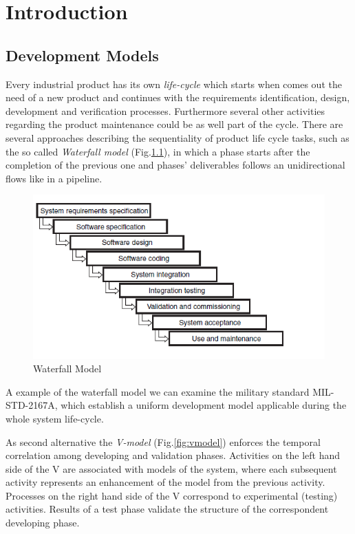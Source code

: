 
\chapter{Introduction}




\section{Development Models}
\label{sec:devmodels}


Every industrial product has its own \textit{life-cycle} which starts when comes out the need of a new product and continues with the requirements identification, design, development and verification processes. Furthermore several other activities regarding the product maintenance could be as well part of the cycle. There are several approaches describing the sequentiality of product life cycle tasks, such as the so called \textit{Waterfall model} (Fig.\ref{fig:waterfall}), in which a phase starts after the completion of the previous one and phases' deliverables follows an unidirectional flows like in a pipeline.
\begin{figure}[!h]
	\centering 
     \includegraphics[width=.75\textwidth]{Figs/waterfall.png} 
     \caption{Waterfall Model} 
     \label{fig:waterfall} 
\end{figure} 

A example of the waterfall model we can examine the military standard MIL-STD-2167A, which establish a uniform development model applicable during the whole system life-cycle.
\par As second alternative  the \textit{V-model} (Fig.\ref{fig:vmodel}) enforces the temporal correlation among developing and validation phases. Activities on the left hand side of the V are associated with models of the system, where each subsequent activity represents an enhancement of the model from the previous activity. Processes on the right hand side of the V correspond to experimental (testing) activities. Results of a test phase validate the structure of the correspondent developing phase.

